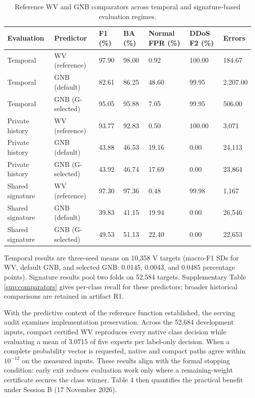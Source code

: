 \documentclass[final,3p,10pt,nopreprintline]{elsarticle}
\begin{document}
\begin{table}[H]\centering\small\setlength{\tabcolsep}{3pt}\renewcommand{\arraystretch}{1.13}
\caption{Reference WV and GNB comparators across temporal and signature-based evaluation regimes.}\label{tab:ensemble}
\begin{tabular}{L{0.17\dimexpr{}\tabcolsep\relax}L{0.22\dimexpr{}\tabcolsep\relax}L{0.11\dimexpr{}\tabcolsep\relax}L{0.11\dimexpr{}\tabcolsep\relax}L{0.15\dimexpr{}\tabcolsep\relax}L{0.12\dimexpr{}\tabcolsep\relax}L{0.12\dimexpr{}\tabcolsep\relax}}\toprule
\textbf{Evaluation} & \textbf{Predictor} & \textbf{F1 (\%)} & \textbf{BA (\%)} & \textbf{Normal FPR (\%)} & \textbf{DDoS F2 (\%)} & \textbf{Errors}\\\midrule
Temporal & WV (reference) & 97.90 & 98.00 & 0.92 & 100.00 & 184.67\\
Temporal & GNB (default) & 82.61 & 86.25 & 48.60 & 99.95 & 2,207.00\\
Temporal & GNB (G-selected) & 95.05 & 95.88 & 7.05 & 99.95 & 506.00\\
Private history & WV (reference) & 93.77 & 92.83 & 0.50 & 100.00 & 3,071\\
Private history & GNB (default) & 43.88 & 46.53 & 19.16 & 0.00 & 24,113\\
Private history & GNB (G-selected) & 43.92 & 46.74 & 17.69 & 0.00 & 23,864\\
Shared signature & WV (reference) & 97.30 & 97.36 & 0.48 & 99.98 & 1,167\\
Shared signature & GNB (default) & 39.83 & 41.15 & 19.94 & 0.00 & 26,546\\
Shared signature & GNB (G-selected) & 49.53 & 51.13 & 22.40 & 0.00 & 22,653\\
\bottomrule\end{tabular}
\end{table}

Temporal results are three-seed means on 10,358 V targets (macro-F1 SDs for WV, default GNB, and selected GNB: 0.0145, 0.0043, and 0.0485 percentage points). Signature results pool two folds on 52,584 targets. Supplementary Table \ref*{sup:comparators} gives per-class recall for these predictors; broader historical comparisons are retained in artifact R1.

With the predictive context of the reference function established, the serving audit examines implementation preservation. Across the 52,684 development inputs, compact certified WV reproduces every native class decision while evaluating a mean of 3.0715 of five experts per label-only decision. When a complete probability vector is requested, native and compact paths agree within \(10^{-12}\) on the measured inputs. These results align with the formal stopping condition: early exit reduces evaluation work only where a remaining-weight certificate secures the class winner. Table 4 then quantifies the practical benefit under Session B (17 November 2026).
\end{document}
